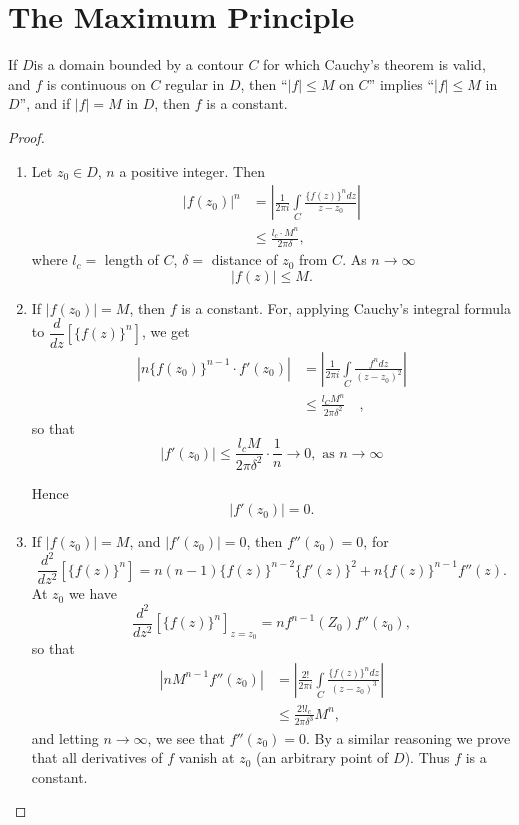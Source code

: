 \chapter{The Maximum Principle}\label{chap1}

\begin{thm}\label{chap1:thm1}
 If $D$\pageoriginale is a domain bounded by a contour $C$ for which
 {\small Cauchy's} theorem is valid, and $f$ is continuous on $C$ regular in
 $D$, then ``$|f| \leq M$ on $C$'' implies ``$|f| \leq M$ in $D$'',
 and if $|f| = M $ in $D$, then $f$ is a constant.
\end{thm}

\begin{proof}
\begin{enumerate}
\renewcommand{\theenumi}{\alph{enumi}}
\renewcommand{\labelenumi}{(\theenumi)}
\item Let $z_0 \in D$, $n$ a positive integer. Then
\begin{align*}
|f(z_0)|^n & = \left| \frac{1}{2\pi i} \int\limits_C \frac{\{f(z)\}^n
  dz}{z-z_0}\right| \\
& \leq \frac{l_c \cdot M^n}{2 \pi \delta},
\end{align*}
where $l_c = $ length of $C$, $\delta = $ distance of $z_0$ from
$C$. As $n \to \infty$ 
$$
|f(z)| \leq M.
$$

\item If $|f(z_0)| = M$, then $f$ is a constant. For, applying
  Cauchy's integral formula to $\dfrac{d}{dz} \left[
    \{f(z)\}^n\right]$, we get
\begin{align*}
|n \{ f(z_0)\}^{n-1}  \cdot f'(z_0)| & = \left|\frac{1}{2\pi i}
\int\limits_C \frac{f^n dz}{(z-z_0)^2} \right|\\
& \leq \frac{l_C M^n}{2\pi \delta^2} \quad ,
\end{align*}
so that 
$$
|f'(z_0)| \leq \frac{l_c M}{2\pi \delta^2} \cdot \frac{1}{n} \to 0,
\text{ as } n \to \infty 
$$

Hence
$$
|f'(z_0)| = 0.
$$

\item If $ |f(z_0)| = M$, \pageoriginale and $|f'(z_0)| =0$, then
  $f''(z_0) = 0$, for $$\dfrac{d^2}{dz^2} \left[ \{f(z)\}^n\right] =
  n(n-1) \{f(z)\}^{n-2} \{f'(z)\}^2 + n \{f(z)\}^{n-1} f''(z).$$ 
At $z_0$ we have
$$
\dfrac{d^2}{dz^2} \left[\{f(z)\}^n \right]_{z=z_0} = n f^{n-1} (Z_0) f''(z_0),
$$
so that
\begin{align*}
|n M^{n-1} f''(z_0)| & = \left| \frac{2!}{2\pi i} \int\limits_C
\frac{\{f(z)\}^n dz}{(z-z_0)^3}\right|\\
& \leq \frac{2! l_c}{2\pi \delta^3} M^n,
\end{align*}
and letting $n \to \infty$, we see that $f''(z_0) =0$. By a similar
reasoning we prove that all derivatives of $f$ vanish at $z_0$ (an
arbitrary point of $D$). Thus $f$ is a constant.
\end{enumerate}
\end{proof}

